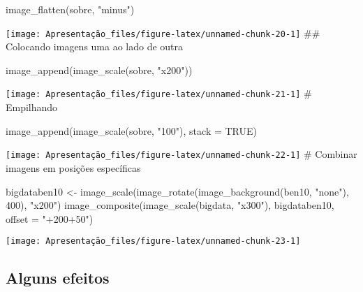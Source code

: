 \documentclass[
]{article}
\newenvironment{Shaded}{\begin{snugshade}}{\end{snugshade}}
\newcommand{\AttributeTok}[1]{\textcolor[rgb]{0.77,0.63,0.00}{#1}}
\newcommand{\ConstantTok}[1]{\textcolor[rgb]{0.00,0.00,0.00}{#1}}
\newcommand{\DecValTok}[1]{\textcolor[rgb]{0.00,0.00,0.81}{#1}}
\newcommand{\FunctionTok}[1]{\textcolor[rgb]{0.00,0.00,0.00}{#1}}
\newcommand{\NormalTok}[1]{#1}
\newcommand{\OtherTok}[1]{\textcolor[rgb]{0.56,0.35,0.01}{#1}}
\newcommand{\StringTok}[1]{\textcolor[rgb]{0.31,0.60,0.02}{#1}}
\begin{document}
\begin{Shaded}
\begin{Highlighting}[]
\FunctionTok{image\_flatten}\NormalTok{(sobre, }\StringTok{"minus"}\NormalTok{)}
\end{Highlighting}
\end{Shaded}

\texttt{[image: Apresentação\_files/figure-latex/unnamed-chunk-20-1]}
\#\# Colocando imagens uma ao lado de outra

\begin{Shaded}
\begin{Highlighting}[]
\FunctionTok{image\_append}\NormalTok{(}\FunctionTok{image\_scale}\NormalTok{(sobre, }\StringTok{"x200"}\NormalTok{))}
\end{Highlighting}
\end{Shaded}

\texttt{[image: Apresentação\_files/figure-latex/unnamed-chunk-21-1]}
\# Empilhando

\begin{Shaded}
\begin{Highlighting}[]
\FunctionTok{image\_append}\NormalTok{(}\FunctionTok{image\_scale}\NormalTok{(sobre, }\StringTok{"100"}\NormalTok{), }\AttributeTok{stack =} \ConstantTok{TRUE}\NormalTok{) }
\end{Highlighting}
\end{Shaded}

\texttt{[image: Apresentação\_files/figure-latex/unnamed-chunk-22-1]}
\# Combinar imagens em posições específicas

\begin{Shaded}
\begin{Highlighting}[]
\NormalTok{bigdataben10 }\OtherTok{\textless{}{-}} \FunctionTok{image\_scale}\NormalTok{(}\FunctionTok{image\_rotate}\NormalTok{(}\FunctionTok{image\_background}\NormalTok{(ben10, }\StringTok{"none"}\NormalTok{), }\DecValTok{400}\NormalTok{), }\StringTok{"x200"}\NormalTok{)}
\FunctionTok{image\_composite}\NormalTok{(}\FunctionTok{image\_scale}\NormalTok{(bigdata, }\StringTok{"x300"}\NormalTok{), bigdataben10, }\AttributeTok{offset =} \StringTok{"+200+50"}\NormalTok{)}
\end{Highlighting}
\end{Shaded}

\texttt{[image: Apresentação\_files/figure-latex/unnamed-chunk-23-1]}

\hypertarget{alguns-efeitos}{%
\subsection{Alguns efeitos}\label{alguns-efeitos}}
\end{document}
